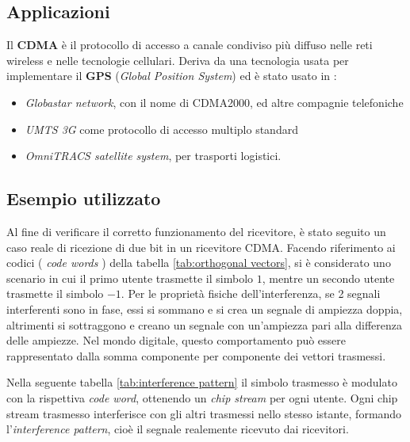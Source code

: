 \documentclass[a4paper,12pt]{article}
\begin{document}
    \subsection{Applicazioni}
     Il \textbf{CDMA} è il protocollo di accesso a canale condiviso più diffuso nelle reti wireless e nelle tecnologie
     cellulari. Deriva da una tecnologia usata per implementare il \textbf{GPS} (\textit{Global Position System}) ed è 
     stato usato in :
     \begin{itemize}
      \item \textit{Globastar network}, con il nome di CDMA2000, ed altre compagnie telefoniche
      \item \textit{UMTS 3G} come protocollo di accesso multiplo standard
      \item \textit{OmniTRACS satellite system}, per trasporti logistici.
     \end{itemize}
  \subsection{Esempio utilizzato}\label{Esempio}
    Al fine di verificare il corretto funzionamento del ricevitore, è stato seguito un caso reale di ricezione di due bit 
    in un ricevitore CDMA. Facendo riferimento ai codici ( \textit{code words} ) della tabella \ref{tab:orthogonal vectors},
    si è considerato uno scenario in cui il primo utente trasmette il simbolo $1$, mentre un secondo utente trasmette il 
    simbolo $-1$. Per le proprietà fisiche dell'interferenza, se 2 segnali interferenti sono in fase, essi si sommano e si
    crea un segnale di ampiezza doppia, altrimenti si sottraggono e creano un segnale con un'ampiezza pari alla differenza 
    delle ampiezze. Nel mondo digitale, questo comportamento può essere rappresentato dalla somma componente per componente
    dei vettori trasmessi.

    Nella seguente tabella \ref{tab:interference pattern} il simbolo trasmesso è modulato con la rispettiva \textit{code word}, ottenendo un
    \textit{chip stream} per ogni utente. Ogni chip stream trasmesso interferisce con gli altri trasmessi nello stesso 
    istante, formando l'\textit{interference pattern}, cioè il segnale realemente ricevuto dai ricevitori.
\end{document}
